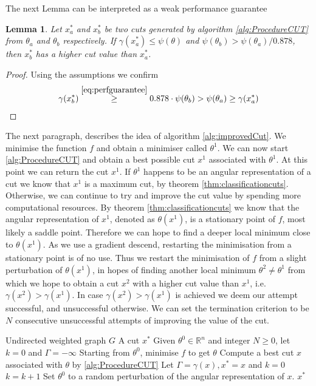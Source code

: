 \documentclass[12pt,a4paper]{article}
\theoremstyle{mythm}
\newtheorem{lem}[thm]{Lemma}
\begin{document}
The next Lemma can be interpreted as a weak performance guarantee
\begin{lem}
Let $ x ^{*} _{ a } $ and $ x ^{*} _{ b } $ be two cuts generated by algorithm \ref{alg:ProcedureCUT} from $ \theta_a $ and $ \theta_b $ respectively.
If $ \gamma ( x ^{ * } _{ a } ) \leq \psi ( \theta) $ and $ \psi ( \theta _{ b } ) > \psi ( \theta_a)/0.878 $, then $ x ^{ * } _{ b }  $ has a higher cut value than $ x ^{ * }
_{ a }  $.
\end{lem} 
\begin{proof}
Using the assumptions we confirm
\begin{align*}
\gamma ( x ^{ * } _{ b } ) \overset{ \ref{eq:perfguarantee}  }{ \geq  } 0.878 \cdot \psi ( \theta_b) > \psi ( \theta_a) \geq \gamma ( x ^{ * } _{ a } ) 
\end{align*} 
\end{proof}
The next paragraph, describes the idea of algorithm \ref{alg:improvedCut}.
We minimise the function $ f $ and obtain a minimiser called $ \theta^1 $. 
We can now start \ref{alg:ProcedureCUT} and obtain a best possible cut $ x^1 $ associated with $ \theta^1 $.
At this point we can return the cut $ x^1 $.
If $ \theta^1 $ happens to be an angular representation of a cut we know that $ x^1 $ is a maximum cut, by theorem \ref{thm:classificationcuts}.
Otherwise, we can continue to try and improve the cut value by spending more computational resources. 
By theorem \ref{thm:classificationcuts} we know that the angular representation of $ x^1 $, denoted as $ \theta ( x^1)  $, is a stationary point of $ f $, most likely a
saddle point. 
Therefore we can hope to find a deeper local minimum close to $ \theta ( x^1) $.
As we use a gradient descend, restarting the minimisation from a stationary point is of no use.
Thus we restart the minimisation of $ f $ from a slight perturbation of $ \theta (x^1) $, in hopes of finding another local minimum $ \theta^2 \neq \theta^1  $ from which we
hope to obtain a cut $ x^2 $ with a higher cut value than $ x^1 $, i.e. $ \gamma (x^2) > \gamma (x^1)  $.
In case $ \gamma (x^2) > \gamma (x^1) $ is achieved we deem our attempt successful, and unsuccessful otherwise.
We can set the termination criterion to be $ N $ consecutive unsuccessful attempts of improving the value of the cut.
\begin{algorithm}
\caption{\ImprovedCut}
\label{alg:improvedCut} 
\begin{algorithmic}[1]
\Require Undirected weighted graph $ G $
\Ensure A cut $ x^* $
\State Given $ \theta^0 \in \mathbb{R} ^{ n }  $ and integer $ N \geq 0  $, let $ k=0 $ and $ \Gamma = - \infty  $
\State Starting from $ \theta^0 $, minimise $ f $ to get $ \theta  $
\State Compute a best cut $ x $ associated with $ \theta $ by \ref{alg:ProcedureCUT} 
\State Let $ \Gamma = \gamma (x), x^* = x $ and $ k=0 $
\Else
\State $ k = k+1 $
\EndIf
\State Set $ \theta^0 $ to a random perturbation of the angular representation of $ x $.
\EndWhile
\State \Return $ x ^{ * }  $
\EndProcedure
\end{algorithmic}
\end{algorithm}
\end{document}
